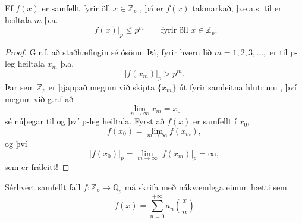 \begin{setn}
Ef $f(x)$ er samfellt fyrir öll $x\in \mathbb{Z}_p$ , þá er $f(x)$ takmarkað, þ.e.a.s. til er heiltala $m$ þ.a. 
\begin{equation*}
|f(x) |_p \leq p^m \qquad \mbox{fyrir öll   } x\in \mathbb{Z}_p.
\end{equation*}
\end{setn}
\begin{proof}
G.r.f. að staðhæfingin sé ósönn. Þá, fyrir hvern lið $m=1,2,3,\ldots,$ er til p-leg heiltala $x_m$ þ.a.
\begin{equation*}
|f(x_m)|_p > p^m.
\end{equation*}
Þar sem $\mathbb{Z}_p$ er þjappað megum við skipta $\{x_m\}$ út fyrir samleitna hlutrunu , því megum við g.r.f að 
\begin{equation*}
\lim_{n \rightarrow \infty} x_m = x_0
\end{equation*}
sé núþegar til og því p-leg heiltala. Fyrst að $f(x)$ er samfellt í $x_0$,
\begin{equation*}
f(x_0) = \lim_{m\rightarrow \infty} f(x_m),
\end{equation*}
og því 
\begin{equation*}
|f(x_0)|_p = \lim_{m \rightarrow \infty} |f(x_m)|_p = \infty,
\end{equation*}
sem er fráleitt!
\end{proof}

\begin{setn}
Sérhvert samfellt fall $f:\mathbb{Z}_p \rightarrow \mathbb{Q}_p$ má skrifa með nákvæmlega einum hætti sem
\begin{equation*}
f(x) = \sum_{n=0}^{+\infty} a_n \binom{x}{n}
\end{equation*} 
\end{setn}

\newpage
\nocite{NewEntry1}
\nocite{NewEntry2}
\nocite{NewEntry3}
\nocite{NewEntry4}






